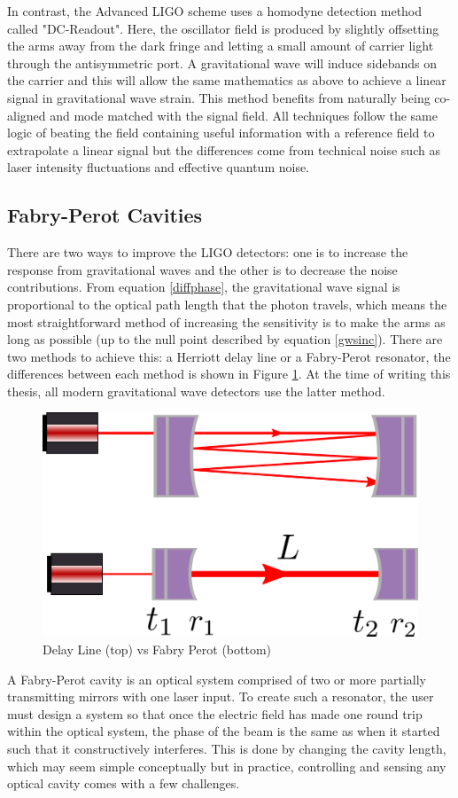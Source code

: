 		In contrast, the Advanced LIGO scheme uses a homodyne detection \cite{HildDCReadout} method called "DC-Readout".  Here, the oscillator field is produced by slightly offsetting the arms away from the dark fringe and letting a small amount of carrier light through the antisymmetric port.  A gravitational wave will induce sidebands on the carrier and this will allow the same mathematics as above to achieve a linear signal in gravitational wave strain. This method benefits from naturally being co-aligned and mode matched with the signal field.  All techniques follow the same logic of beating the field containing useful information with a reference field to extrapolate a linear signal but the differences come from technical noise such as laser intensity fluctuations and effective quantum noise.
	
		\subsection{Fabry-Perot Cavities}\label{FP}
		There are two ways to improve the LIGO detectors: one is to increase the response from gravitational waves and the other is to decrease the noise contributions. From equation \ref{diffphase}, the gravitational wave signal is proportional to the optical path length that the photon travels, which means the most straightforward method of increasing the sensitivity is to make the arms as long as possible (up to the null point described by equation \ref{gwsinc}).  There are two methods to achieve this: a Herriott delay line or a Fabry-Perot resonator, the differences between each method is shown in Figure \ref{fig:FPvDL}.  At the time of writing this thesis, all modern gravitational wave detectors use the latter method.
		
		\begin{figure}[h]
		\centering
		\includegraphics[width=.5 \textwidth]{../Figures/FPvDL.png}
		\caption{Delay Line (top) vs Fabry Perot (bottom)}
		\label{fig:FPvDL}
		\end{figure}
	
		A Fabry-Perot cavity is an optical system comprised of two or more partially transmitting mirrors with one laser input.  To create such a resonator, the user must design a system so that once the electric field has made one round trip within the optical system, the phase of the beam is the same as when it started such that it constructively interferes.  This is done by changing the cavity length, which may seem simple conceptually but in practice, controlling and sensing any optical cavity comes with a few challenges.
		
